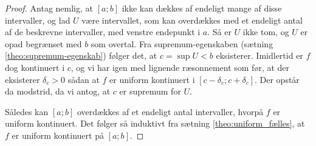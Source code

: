 \begin{proof}
  Antag nemlig, at $[a;b]$ ikke kan dækkes af endeligt mange af disse intervaller, og lad $U$ være intervallet, som kan overdækkes med et endeligt antal af de beskrevne intervaller, med venstre endepunkt i $a$. 
Så er $U$ ikke tom, og $U$ er opad begrænset med $b$ som overtal. 
  Fra supremum-egenskaben (sætning \ref{theo:supremum-egenskab}) følger det, at $c=\sup U<b$ eksisterer. 
  Imidlertid er $f$ dog kontinuert i $c$, og vi har igen med lignende ræsonnement som før, at der eksisterer $\delta _c>0$ sådan at $f$ er uniform kontinuert i $[c-\delta _c;c+\delta _c]$. 
  Der opstår da modstrid, da vi antog, at $c$ er supremum for $U$. 

Således kan $[a;b]$ overdækkes af et endeligt antal intervaller, hvorpå $f$ er uniform kontinuert.
  Det følger så induktivt fra sætning \ref{theo:uniform_fælles}, at $f$ er uniform kontinuert på $[a;b]$.
\end{proof}

